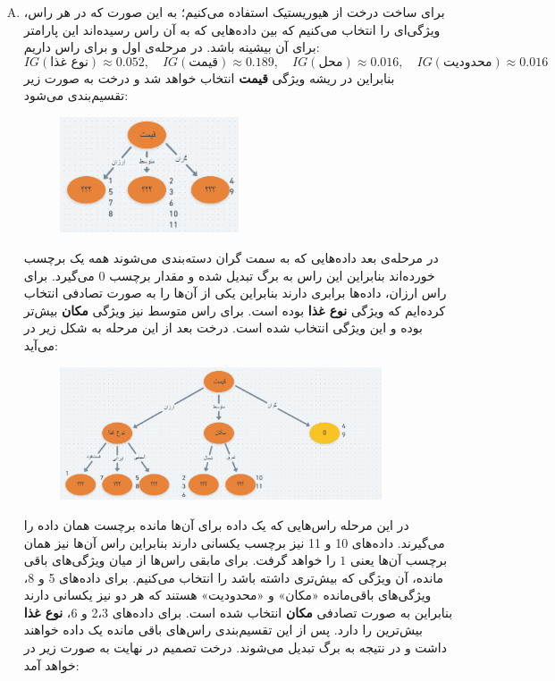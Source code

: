 \documentclass[a4paper, 12pt]{article}
\begin{document}
\begin{enumerate}[A)]
	\item
	برای ساخت درخت از هیوریستیک  استفاده می‌کنیم؛ به این صورت که در هر راس، ویژگی‌ای را انتخاب می‌کنیم که بین داده‌هایی که به آن راس رسیده‌اند این پارامتر برای آن بیشینه باشد. در مرحله‌ی اول و برای راس داریم:
	\[
	IG(\text{نوع غذا}) \approx 0.052, \quad
	IG(\text{قیمت}) \approx 0.189, \quad
	IG(\text{محل}) \approx 0.016, \quad
	IG(\text{محدودیت}) \approx 0.016
	\]
	بنابراین در ریشه ویژگی \textbf{قیمت} انتخاب خواهد شد و درخت به صورت زیر تقسیم‌بندی می‌شود:
	\begin{figure}[H]
		\centering
		\includegraphics[width=0.5\textwidth]{dt1.png}
	\end{figure}
	در مرحله‌ی بعد داده‌هایی که به سمت گران دسته‌بندی  می‌شوند همه یک برچسب خورده‌اند بنابراین این راس به برگ تبدیل شده و مقدار برچسب $0$ می‌گیرد. برای راس ارزان، داده‌ها  برابری دارند بنابراین یکی از آن‌ها را به صورت تصادفی انتخاب کرده‌ایم که ویژگی \textbf{نوع غذا} بوده است. برای راس متوسط نیز  ویژگی \textbf{مکان} بیش‌تر بوده و این ویژگی انتخاب شده است. درخت بعد از این مرحله به شکل زیر در می‌آید:
	\begin{figure}[H]
		\centering
		\includegraphics[width=0.9\textwidth]{dt2.png}
	\end{figure}
	در این مرحله راس‌هایی که یک داده برای آن‌ها مانده برچست همان داده را می‌گیرند. داده‌های 10 و 11 نیز برچسب یکسانی دارند بنابراین راس آن‌ها نیز همان برچسب آن‌ها یعنی $1$ را خواهد گرفت. برای مابقی راس‌ها از میان ویژگی‌های باقی مانده، آن ویژگی که  بیش‌تری داشته باشد را انتخاب می‌کنیم. برای داده‌های 5 و 8، ویژگی‌های باقی‌مانده «مکان» و «محدودیت» هستند که هر دو نیز  یکسانی دارند بنابراین به صورت تصادفی \textbf{مکان} انتخاب شده است. برای داده‌های 2،3 و 6، \textbf{نوع غذا} بیش‌ترین  را دارد. پس از این تقسیم‌بندی راس‌های باقی مانده یک داده خواهند داشت و در نتیجه به برگ تبدیل می‌شوند. درخت تصمیم در نهایت به صورت زیر در خواهد آمد:

\end{enumerate}
\end{document}
